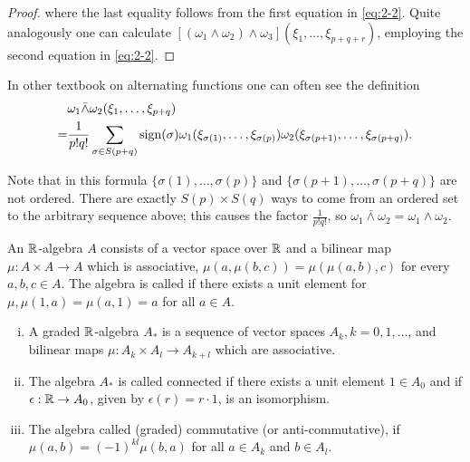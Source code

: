 \begin{proof}
  where the last equality follows from the first equation in \eqref{eq:2-2}. Quite analogously one can calculate
  $[(\omega_1\wedge\omega_2)\wedge\omega_3](\xi_1, \ldots, \xi_{p+q+r})$, employing the second equation in \eqref{eq:2-2}.
\end{proof}

\begin{remark}\label{remark:2-10}
In other textbook on alternating functions one can often see the definition
\begin{align*}
    & \omega_{1}\bar{\wedge}\omega_{2}(\xi_{1},\ldots,\xi_{p+q})\\
  = & \frac{1}{p!q!}\sum_{\sigma\in S(p+q)}\operatorname{sign}(\sigma)
      \omega_{1}(\xi_{\sigma(1)},\ldots,\xi_{\sigma(p)})
      \omega_{2}(\xi_{\sigma(p+1)},\ldots,\xi_{\sigma(p+q)}).
\end{align*}

Note that in this formula $\{\sigma(1), \ldots,\sigma(p)\}$ and $\{\sigma(p + 1), \ldots, \sigma(p + q)\}$ are not
ordered. There are exactly $S(p)\times S(q)$ ways to come from an ordered set to the arbitrary sequence above; 
this causes the factor $\frac{1}{p!q!}$, so $\omega_1\bar{\wedge}\omega_2 = \omega_1\wedge\omega_2$.
\end{remark}

An ${\mathbb{R}}$-algebra $A$ consists of a vector space over ${\mathbb{R}}$ and a bilinear map $\mu:A\times A\to A$
which is associative, $\mu(a, \mu(b,c)) = \mu(\mu(a, b), c)$ for every $a,b,c \in A$. The
algebra is called  if there exists a unit element for $\mu, \mu(1, a) = \mu( a, 1) = a$
for all $a\in A$.

\begin{definition}\label{definition:2-11}
  \begin{enumerate}[(i)]
    \item A graded ${\mathbb{R}}$-algebra $A_*$ is a sequence of vector spaces $A_k, k = 0,1, \ldots$,
      and bilinear maps $\mu:A_k\times A_l\to A_{k+l}$ which are associative.
    \item The algebra $A_*$ is called connected if there exists a unit element $1\in A_0$ and 
      if $\epsilon:{\mathbb{R}}\to A_0$, given by $\epsilon(r) = r\cdot 1$, is an isomorphism.
    \item The algebra called (graded) commutative (or anti-commutative), if $\mu(a, b) = (-1)^{kl}\mu(b, a)$
      for all $a\in A_k$ and $b\in A_l$.
  \end{enumerate}
\end{definition}


